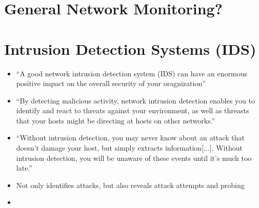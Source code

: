 
\section{General Network Monitoring?}

\section{Intrusion Detection Systems (IDS)}
	\begin{itemize}
		\item \enquote{A good network intrusion detection system (IDS) can have an enormous positive impact on the overall security of your oragnization} \parencite{Northcutt2005}
		\item \enquote{By detecting malicious activity, network intrusion detection enables you to identify and react to threats against your environment, as well as threasts that your hosts might be directing at hosts on other networks.} \parencite[p. 201]{Northcutt2005}
		\item \enquote{Without intrusion detection, you may never know about an attack that doesn't damage your host, but simply extracts information[...]. Without intrusion detection, you will be unaware of these events until it's much too late.} \parencite[p. 202]{Northcutt2005}
		\item Not only identifies attacks, but also reveals attack attempts and probing \parencite[p. 202]{Northcutt2005}
		\item 
	\end{itemize}

